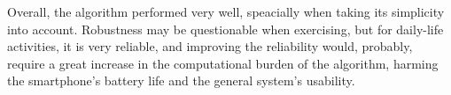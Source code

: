 

Overall, the algorithm performed very well, speacially when taking its simplicity into account. Robustness may be questionable when exercising, but for daily-life activities, it is very reliable, and improving the reliability would, probably, require a great increase in the computational burden of the algorithm, harming the smartphone's battery life and the general system's usability.